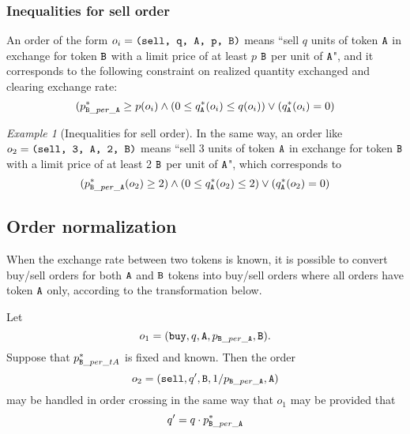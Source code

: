 \documentclass[11pt, reqno]{amsart}
\theoremstyle{definition}
\theoremstyle{remark}
\newtheorem{exmp}{Example}[subsection]
\newcommand{\tA}{\textnormal{\texttt{A}}}
\newcommand{\tB}{\textnormal{\texttt{B}}}
\newcommand{\buy}{\textnormal{\texttt{buy}}}
\newcommand{\sell}{\textnormal{\texttt{sell}}}
\begin{document}
\subsubsection{Inequalities for sell order}
An order of the form $o_i = \texttt{(\sell, q, \tA, p, \tB)}$ means
``sell $q$ units of token $\tA$ in exchange for token $\tB$ with a limit price
of at least $p$ $\tB$ per unit of $\tA$",
and it corresponds to the following constraint on realized quantity exchanged
and clearing exchange rate:
\begin{equation*}
	(p_{\tB\_per\_\tA}^* \geq p(o_i) \land
	(0 \le q_\tA^*(o_i) \leq q(o_i)) \lor
	(q_\tA^*(o_i) = 0)
\end{equation*}

\begin{exmp}[Inequalities for sell order]
In the same way, an order like $o_2 = \texttt{(sell, 3, \tA, 2, \tB)}$ means
``sell 3 units of token $\tA$ in exchange for token $\tB$ with a limit price of
at least 2 $\tB$ per unit of $\tA$", which corresponds to
\begin{equation*}
    (p_{\tB\_per\_\tA}^*(o_2) \geq 2) \land
    (0 \le q_\tA^*(o_2) \leq 2) \lor
    (q_\tA^*(o_2) = 0)
\end{equation*}
\end{exmp}

\subsection{Order normalization}
When the exchange rate between two tokens is known, it is possible to convert
buy/sell orders for both $\tA$ and $\tB$ tokens into buy/sell orders where all
orders have token $\tA$ only, according to the transformation below.

Let
\[
	o_1 = (\buy, q, \tA, p_{\tB\_per\_\tA}, \tB).
\]
Suppose that $p^*_{\tB\_per\_tA}$ is fixed and known. Then the order
\[
	o_2 = (\sell, q^\prime, \tB, 1 / p_{\tB\_per\_\tA}, \tA)
\]
may be handled in order crossing in the same way that $o_1$ may be
provided that
\[
	q^\prime = q \cdot p^*_{\tB\_per\_\tA}
\]

%
%
%
\end{document}
